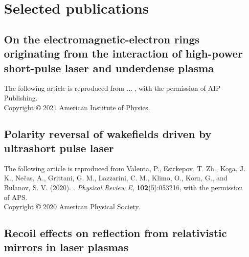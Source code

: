 \documentclass[10pt, twoside, a4paper, openright]{report}
\newcommand{\link}[3][blue]{\href{#2}{\color{#1}{#3}}}%
\begin{document}
\chapter{Selected publications \label{chap:selected_publications}}
%

\section{On the electromagnetic-electron rings originating from the interaction of high-power short-pulse laser and underdense plasma \label{sec:paper_1}}

The following article is reproduced from ... , with the permission of AIP Publishing. \\

\noindent Copyright {\copyright} {2021} {American Institute of Physics}.

\newpage
\mbox{}
\thispagestyle{empty}

%


\newpage
\section{Polarity reversal of wakefields driven by ultrashort pulse laser \label{sec:paper_2}}

The following article is reproduced from Valenta, P., Esirkepov, T. Zh., Koga, J. K., Nečas, A., Grittani, G. M., Lazzarini, C. M., Klimo, O., Korn, G., and Bulanov, S. V. (2020). \link{http://dx.doi.org/10.1103/PhysRevE.102.053216}{Polarity reversal of wakefields driven by ultrashort pulse laser}. \textit{Physical Review E}, \textbf{102}(5):053216, with the permission of APS. \\

\noindent Copyright {\copyright} {2020} {American Physical Society}.

\newpage
\mbox{}
\thispagestyle{empty}

\newpage


\mbox{}
\thispagestyle{empty}
\newpage

\section{Recoil effects on reflection from relativistic mirrors in laser plasmas \label{sec:paper_3}}
\end{document}
